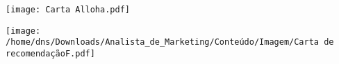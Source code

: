 \documentclass[10pt,a4paper,ragged2e,withhyper]{altacv}
\begin{document}
\begin{paracol}{2}





%

%

%

%

%

\end{paracol}

\begin{paracol}{1}
	\texttt{[image: Carta Alloha.pdf]}\\
\end{paracol}

\begin{paracol}{1}
	\texttt{[image: /home/dns/Downloads/Analista\_de\_Marketing/Conteúdo/Imagem/Carta de recomendaçãoF.pdf]}\\
\end{paracol}

\end{document}
